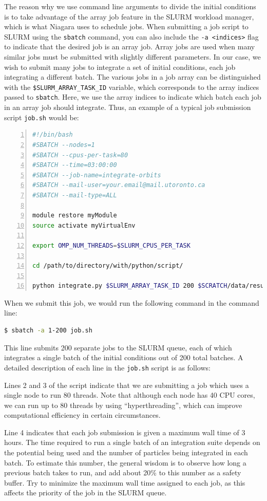 \documentclass[10pt]{article}
\begin{document}
The reason why we use command line arguments to divide the initial conditions is to take advantage of the array job feature in the SLURM workload manager, which is what Niagara uses to schedule jobs. When submitting a job script to SLURM using the \texttt{sbatch} command, you can also include the \texttt{-a <indices>} flag to indicate that the desired job is an array job. Array jobs are used when many similar jobs must be submitted with slightly different parameters. In our case, we wish to submit many jobs to integrate a set of initial conditions, each job integrating a different batch. The various jobs in a job array can be distinguished with the \texttt{\$SLURM\_ARRAY\_TASK\_ID} variable, which corresponds to the array indices passed to \texttt{sbatch}. Here, we use the array indices to indicate which batch each job in an array job should integrate. Thus, an example of a typical job submission script \texttt{job.sh} would be:
\begin{lstlisting}[language=bash, numbers=left]
#!/bin/bash
#SBATCH --nodes=1
#SBATCH --cpus-per-task=80
#SBATCH --time=03:00:00
#SBATCH --job-name=integrate-orbits
#SBATCH --mail-user=your.email@mail.utoronto.ca
#SBATCH --mail-type=ALL

module restore myModule
source activate myVirtualEnv

export OMP_NUM_THREADS=$SLURM_CPUS_PER_TASK

cd /path/to/directory/with/python/script/

python integrate.py $SLURM_ARRAY_TASK_ID 200 $SCRATCH/data/results
\end{lstlisting}
When we submit this job, we would run the following command in the command line:
\begin{lstlisting}[language=bash]
$ sbatch -a 1-200 job.sh
\end{lstlisting}
This line submits 200 separate jobs to the SLURM queue, each of which integrates a single batch of the initial conditions out of 200 total batches. A detailed description of each line in the \texttt{job.sh} script is as follows:

Lines 2 and 3 of the script indicate that we are submitting a job which uses a single node to run 80 threads. Note that although each node has 40 CPU cores, we can run up to 80 threads by using ``hyperthreading'', which can improve computational efficiency in certain circumstances. 

Line 4 indicates that each job submission is given a maximum wall time of 3 hours. The time required to run a single batch of an integration suite depends on the potential being used and the number of particles being integrated in each batch. To estimate this number, the general wisdom is to observe how long a previous batch takes to run, and add about 20\% to this number as a safety buffer. Try to minimize the maximum wall time assigned to each job, as this affects the priority of the job in the SLURM queue.
\end{document}
